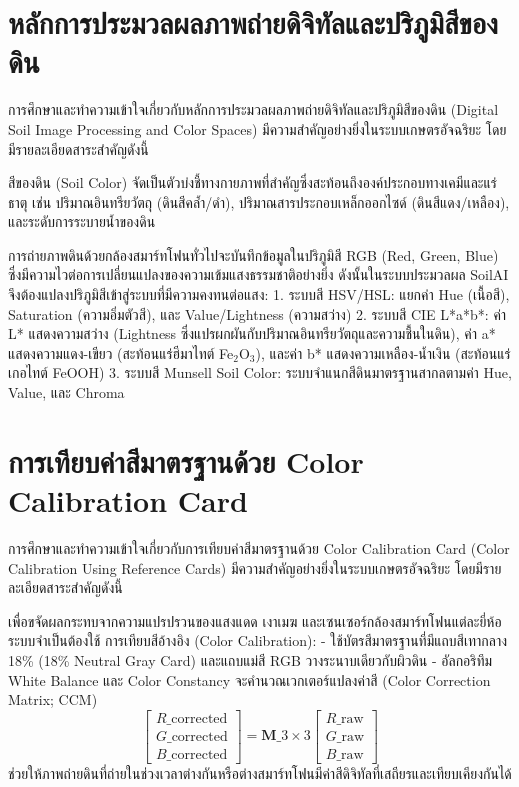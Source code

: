 
\section{หลักการประมวลผลภาพถ่ายดิจิทัลและปริภูมิสีของดิน}

การศึกษาและทำความเข้าใจเกี่ยวกับหลักการประมวลผลภาพถ่ายดิจิทัลและปริภูมิสีของดิน (Digital Soil Image Processing and Color Spaces) มีความสำคัญอย่างยิ่งในระบบเกษตรอัจฉริยะ โดยมีรายละเอียดสาระสำคัญดังนี้

สีของดิน (Soil Color) จัดเป็นตัวบ่งชี้ทางกายภาพที่สำคัญซึ่งสะท้อนถึงองค์ประกอบทางเคมีและแร่ธาตุ เช่น ปริมาณอินทรียวัตถุ (ดินสีคล้ำ/ดำ), ปริมาณสารประกอบเหล็กออกไซด์ (ดินสีแดง/เหลือง), และระดับการระบายน้ำของดิน

การถ่ายภาพดินด้วยกล้องสมาร์ทโฟนทั่วไปจะบันทึกข้อมูลในปริภูมิสี RGB (Red, Green, Blue) ซึ่งมีความไวต่อการเปลี่ยนแปลงของความเข้มแสงธรรมชาติอย่างยิ่ง ดังนั้นในระบบประมวลผล SoilAI จึงต้องแปลงปริภูมิสีเข้าสู่ระบบที่มีความคงทนต่อแสง:
1. ระบบสี HSV/HSL: แยกค่า Hue (เนื้อสี), Saturation (ความอิ่มตัวสี), และ Value/Lightness (ความสว่าง)
2. ระบบสี CIE L*a*b*: ค่า L* แสดงความสว่าง (Lightness ซึ่งแปรผกผันกับปริมาณอินทรียวัตถุและความชื้นในดิน), ค่า a* แสดงความแดง-เขียว (สะท้อนแร่ฮีมาไทต์ Fe$_2$O$_3$), และค่า b* แสดงความเหลือง-น้ำเงิน (สะท้อนแร่เกอไทต์ FeOOH)
3. ระบบสี Munsell Soil Color: ระบบจำแนกสีดินมาตรฐานสากลตามค่า Hue, Value, และ Chroma

\section{การเทียบค่าสีมาตรฐานด้วย Color Calibration Card}

การศึกษาและทำความเข้าใจเกี่ยวกับการเทียบค่าสีมาตรฐานด้วย Color Calibration Card (Color Calibration Using Reference Cards) มีความสำคัญอย่างยิ่งในระบบเกษตรอัจฉริยะ โดยมีรายละเอียดสาระสำคัญดังนี้

เพื่อขจัดผลกระทบจากความแปรปรวนของแสงแดด เงาเมฆ และเซนเซอร์กล้องสมาร์ทโฟนแต่ละยี่ห้อ ระบบจำเป็นต้องใช้ การเทียบสีอ้างอิง (Color Calibration):
- ใช้บัตรสีมาตรฐานที่มีแถบสีเทากลาง 18\% (18\% Neutral Gray Card) และแถบแม่สี RGB วางระนาบเดียวกับผิวดิน
- อัลกอริทึม White Balance และ Color Constancy จะคำนวณเวกเตอร์แปลงค่าสี (Color Correction Matrix; CCM)
\[ \begin{bmatrix} R\_{\text{corrected}} \\ G\_{\text{corrected}} \\ B\_{\text{corrected}} \end{bmatrix} = \mathbf{M}\_{3\times 3} \begin{bmatrix} R\_{\text{raw}} \\ G\_{\text{raw}} \\ B\_{\text{raw}} \end{bmatrix} \]
ช่วยให้ภาพถ่ายดินที่ถ่ายในช่วงเวลาต่างกันหรือต่างสมาร์ทโฟนมีค่าสีดิจิทัลที่เสถียรและเทียบเคียงกันได้


